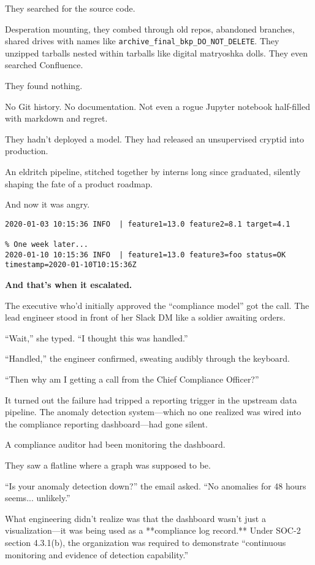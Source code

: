 They searched for the source code.

Desperation mounting, they combed through old repos, abandoned branches, shared drives with names like \texttt{archive\_final\_bkp\_DO\_NOT\_DELETE}. They unzipped tarballs nested within tarballs like digital matryoshka dolls. They even searched Confluence.

They found nothing.

No Git history. No documentation. Not even a rogue Jupyter notebook half-filled with markdown and regret.

They hadn’t deployed a model.  
They had released an unsupervised cryptid into production.

An eldritch pipeline, stitched together by interns long since graduated, silently shaping the fate of a product roadmap.

And now it was angry.

\begin{lstlisting}[caption={The log that broke the build}, label={lst:falllogs}, basicstyle=\ttfamily\small, frame=single]
2020-01-03 10:15:36 INFO  | feature1=13.0 feature2=8.1 target=4.1

% One week later...
2020-01-10 10:15:36 INFO  | feature1=13.0 feature3=foo status=OK timestamp=2020-01-10T10:15:36Z
\end{lstlisting}

\textbf{And that’s when it escalated.}

The executive who’d initially approved the “compliance model” got the call. The lead engineer stood in front of her Slack DM like a soldier awaiting orders.

“Wait,” she typed. “I thought this was handled.”

“Handled,” the engineer confirmed, sweating audibly through the keyboard.

“Then why am I getting a call from the Chief Compliance Officer?”

It turned out the failure had tripped a reporting trigger in the upstream data pipeline. The anomaly detection system—which no one realized was wired into the compliance reporting dashboard—had gone silent.

A compliance auditor had been monitoring the dashboard.

They saw a flatline where a graph was supposed to be.

“Is your anomaly detection down?” the email asked.  “No anomalies for 48 hours seems... unlikely.”

What engineering didn’t realize was that the dashboard wasn’t just a visualization—it was being used as a **compliance log record.** Under SOC-2 section 4.3.1(b), the organization was required to demonstrate “continuous monitoring and evidence of detection capability.”

